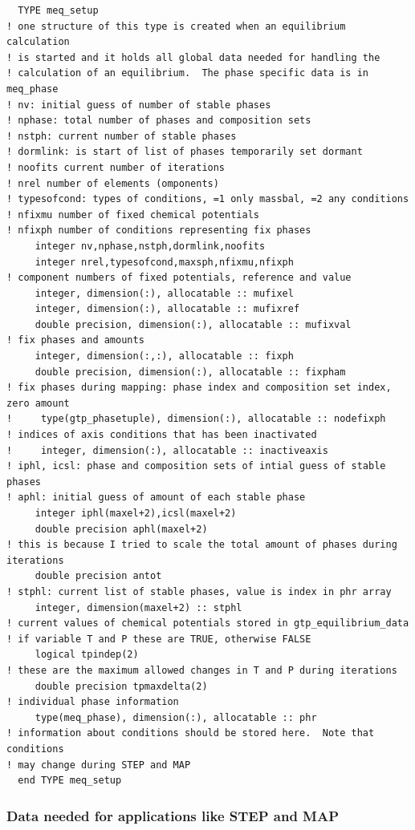 \documentclass[12pt]{article}
\begin{document}
{\small
\begin{verbatim}
  TYPE meq_setup
! one structure of this type is created when an equilibrium calculation
! is started and it holds all global data needed for handling the
! calculation of an equilibrium.  The phase specific data is in meq_phase
! nv: initial guess of number of stable phases
! nphase: total number of phases and composition sets
! nstph: current number of stable phases
! dormlink: is start of list of phases temporarily set dormant
! noofits current number of iterations
! nrel number of elements (omponents)
! typesofcond: types of conditions, =1 only massbal, =2 any conditions
! nfixmu number of fixed chemical potentials
! nfixph number of conditions representing fix phases
     integer nv,nphase,nstph,dormlink,noofits
     integer nrel,typesofcond,maxsph,nfixmu,nfixph
! component numbers of fixed potentials, reference and value
     integer, dimension(:), allocatable :: mufixel
     integer, dimension(:), allocatable :: mufixref
     double precision, dimension(:), allocatable :: mufixval
! fix phases and amounts
     integer, dimension(:,:), allocatable :: fixph
     double precision, dimension(:), allocatable :: fixpham
! fix phases during mapping: phase index and composition set index, zero amount
!     type(gtp_phasetuple), dimension(:), allocatable :: nodefixph
! indices of axis conditions that has been inactivated
!     integer, dimension(:), allocatable :: inactiveaxis
! iphl, icsl: phase and composition sets of intial guess of stable phases
! aphl: initial guess of amount of each stable phase
     integer iphl(maxel+2),icsl(maxel+2)
     double precision aphl(maxel+2)
! this is because I tried to scale the total amount of phases during iterations
     double precision antot
! stphl: current list of stable phases, value is index in phr array
     integer, dimension(maxel+2) :: stphl
! current values of chemical potentials stored in gtp_equilibrium_data
! if variable T and P these are TRUE, otherwise FALSE
     logical tpindep(2)
! these are the maximum allowed changes in T and P during iterations
     double precision tpmaxdelta(2)
! individual phase information
     type(meq_phase), dimension(:), allocatable :: phr
! information about conditions should be stored here.  Note that conditions
! may change during STEP and MAP
  end TYPE meq_setup
\end{verbatim}
}

\subsubsection{Data needed for applications like STEP and MAP}
\end{document}
